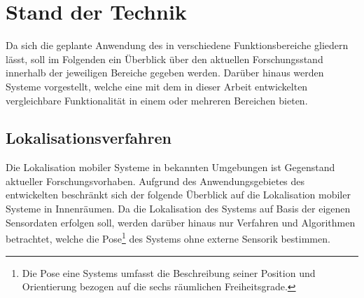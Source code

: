 \chapter{Stand der Technik}
\label{chap:tech}


Da sich die geplante Anwendung des  in verschiedene Funktionsbereiche gliedern lässt, soll im Folgenden ein Überblick über den aktuellen Forschungsstand innerhalb der jeweiligen Bereiche gegeben werden. Darüber hinaus werden Systeme vorgestellt, welche eine mit dem in dieser Arbeit entwickelten \kps{} vergleichbare Funktionalität in einem oder mehreren Bereichen bieten.

\section{Lokalisationsverfahren}
\label{chap:mcl}
Die Lokalisation mobiler Systeme in bekannten Umgebungen ist Gegenstand aktueller Forschungsvorhaben. Aufgrund des Anwendungsgebietes des entwickelten  beschränkt sich der folgende Überblick auf die Lokalisation mobiler Systeme in Innenräumen. Da die Lokalisation des Systems auf Basis der eigenen Sensordaten erfolgen soll, werden darüber hinaus nur Verfahren und Algorithmen betrachtet, welche die Pose\footnote{Die Pose eine Systems umfasst die Beschreibung seiner Position und Orientierung bezogen auf die sechs räumlichen Freiheitsgrade.
} des Systems ohne externe Sensorik bestimmen.\\

